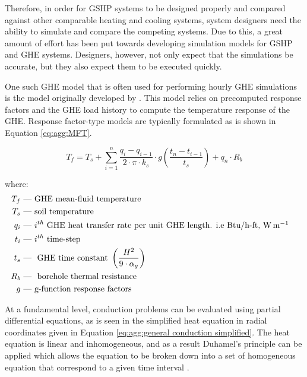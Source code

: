\documentclass[review,12pt]{elsarticle}
\begin{document}
Therefore, in order for GSHP systems to be designed properly and compared against other comparable heating and cooling systems, system designers need the ability to simulate and compare the competing systems. Due to this, a great amount of effort has been put towards developing simulation models for GSHP and GHE systems. Designers, however, not only expect that the simulations be accurate, but they also expect them to be executed quickly.

One such GHE model that is often used for performing hourly GHE simulations is the model originally developed by \cite{EskilsonClaesson1988}. This model relies on precomputed response factors and the GHE load history to compute the temperature response of the GHE. Response factor-type models are typically formulated as is shown in Equation \ref{eq:agg:MFT}.

\begin{equation}
    T_f = T_s + \sum_{i=1}^n \frac{q_{i} - q_{i-1}}{2 \cdot \pi \cdot k_s} \cdot g\left(\frac{t_n - t_{i-1}}{t_s}\right) +  q_n \cdot R_b
    \label{eq:agg:MFT}
\end{equation}

where:
\begin{align*}
    T_f & \mbox{ --- } \mbox{GHE mean-fluid temperature} && \\
    T_s & \mbox{ --- }\mbox{soil temperature} && \\
    q_i & \mbox{ --- }i^{th} \mbox{ GHE heat transfer rate per unit GHE length. i.e Btu/h-ft, \SI{}{\watt\per\meter}} && \\
    t_i & \mbox{ --- }i^{th} \mbox{ time-step} && \\
    t_s & \mbox{ --- }\mbox{ GHE time constant } \left(\frac{H^2}{9\cdot\alpha_g}\right) && \\
    R_b & \mbox{ --- }\mbox{ borehole thermal resistance} && \\
    g & \mbox{ --- }\mbox{g-function response factors} && \\
\end{align*}

At a fundamental level, conduction problems can be evaluated using partial differential equations, as is seen in the simplified heat equation in radial coordinates given in Equation \ref{eq:agg:general conduction simplified}. The heat equation is linear and inhomogeneous, and as a result Duhamel's principle can be applied which allows the equation to be broken down into a set of homogeneous equation that correspond to a given time interval \citep{Cullin2014}.
\end{document}
